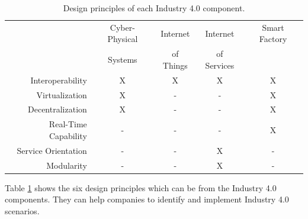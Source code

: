 \begin{table}[htpb]
  \centering
    \begin{tabular}{| r | c c c c |}
      \rowcolor{ob_orange}
      \hline
                            & Cyber-Physical & Internet  & Internet    & Smart Factory \\
      \rowcolor{ob_orange}
                            & Systems        & of Things & of Services &  \\
      \hline
      Interoperability      & X        & X        & X          & X    \\
      Virtualization        & X        & -        & -          & X    \\
      Decentralization      & X        & -        & -          & X    \\
      Real-Time Capability  & -        & -        & -          & X    \\
      Service Orientation   & -        & -        & X          & -    \\
      Modularity            & -        & -        & X          & -    \\
      \hline
    \end{tabular}
  \caption[Design principles of each Industry 4.0 component]{Design principles of each Industry 4.0 component.\autocite[cf.][p. 11]{Her:2015}}
  \label{tab:industryComponents}
\end{table}

Table \ref{tab:industryComponents} shows the six design principles which can be from the Industry 4.0 components.
They can help companies to identify and implement Industry 4.0 scenarios.\autocite[cf.][p. 11]{Her:2015}

